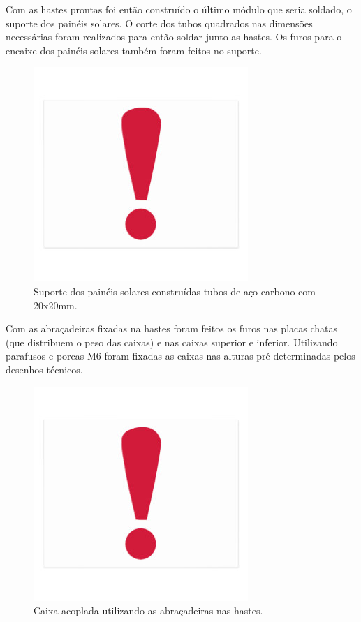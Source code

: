 Com as hastes prontas foi então construído o último módulo que seria soldado, o suporte dos painéis solares. O corte dos tubos quadrados nas dimensões necessárias foram realizados para então soldar junto as hastes. Os furos para o encaixe dos painéis solares também foram feitos no suporte.

\begin{figure}[H]
	\centering
    \includegraphics[keepaspectratio=true,scale=1]{figuras/nophoto.jpg}
    \caption{Suporte dos painéis solares construídas tubos de aço carbono com 20x20mm.}
    \label{supaisolcons}
\end{figure}

Com as abraçadeiras fixadas na hastes foram feitos os furos nas placas chatas (que distribuem o peso das caixas) e nas caixas superior e inferior. Utilizando parafusos e porcas M6 foram fixadas as caixas nas alturas pré-determinadas pelos desenhos técnicos. 

\begin{figure}[H]
	\centering
    \includegraphics[keepaspectratio=true,scale=1]{figuras/nophoto.jpg}
    \caption{Caixa acoplada utilizando as abraçadeiras nas hastes.}
    \label{caixaacop}
\end{figure}

